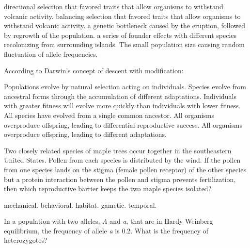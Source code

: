 \begin{choices}
\choice directional selection that favored traits that allow organisms to withstand volcanic activity. %
\choice balancing selection that favored traits that allow organisms to withstand volcanic activity. %
\choice a genetic bottleneck caused by the eruption, followed by regrowth of the population. %
\correctchoice a series of founder effects with different species recolonizing from surrounding islands. %
\choice The small population size causing random fluctuation of allele frequencies. %
\end{choices}


\question
According to Darwin's concept of descent with modification:

\begin{choices}
\choice Populations evolve by natural selection acting on individuals. %
\correctchoice Species evolve from ancestral forms through the accumulation of different adaptations. %
\choice Individuals with greater fitness will evolve more quickly than individuals with lower fitness. %
\choice All species have evolved from a single common ancestor. %
\choice All organisms overproduce offspring, leading to differential reproductive success. %
\choice All organisms overproduce offspring, leading to different adaptations. %
\end{choices}

\question
Two closely related species of maple trees occur together in the southeastern United States.  Pollen from each species is distributed by the wind.  If the pollen from one species lands on the stigma (female pollen receptor) of the other species but a protein interaction between the pollen and stigma prevents fertilization, then which reproductive barrier keeps the two maple species isolated?

\begin{choices}
\choice mechanical.%
\choice behavioral.%
\choice habitat.%
\correctchoice gametic.%
\choice temporal.%
\end{choices}


\question
In a population with two alleles, \textit{A} and \textit{a}, that are in Hardy-Weinberg equilibrium, the frequency of allele \textit{a} is 0.2. What is the frequency of heterozygotes? 

\begin{choices}
\end{choices}

